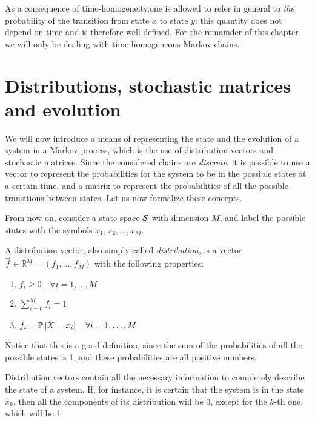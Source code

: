 As a consequence of time-homogeneity,one is allowed to refer in general to \emph{the} probability of the transition from state $x$ to state $y$: this quantity does not depend on time and is therefore well defined. For the remainder of this chapter we will only be dealing with time-homogeneous Markov chains.

\section{Distributions, stochastic matrices and evolution}
We will now introduce a means of representing the state and the evolution of a system in a Markov process, which is the use of distribution vectors and stochastic matrices. Since the considered chains are \emph{discrete}, it is possible to use a vector to represent the probabilities for the system to be in the possible states at a certain time, and a matrix to represent the probabilities of all the possible transitions between states. Let us now formalize these concepts.

\smallskip
From now on, consider a state space $\mathcal{S}$ with dimension $M$, and label the possible states with the symbols $x_1, x_2, \dots, x_M$.

\begin{ndef} \label{def:distribution}
    A distribution vector, also simply called \emph{distribution}, is a vector $\vec{f} \in \mathbb{R}^M = (f_1, \dots, f_M)$ with the following properties:
    \begin{center}
        \begin{enumerate}
            \item $ f_i \geq 0 \quad \forall i = 1,\dots, M $
            \item $\sum_{i=0}^M f_i = 1$
            \item $f_i = \mathbb{P}\left[X = x_i\right] \quad \forall i = 1,\dots, M$
        \end{enumerate}
    \end{center}
    Notice that this is a good definition, since the sum of the probabilities of all the possible states is 1, and these probabilities are all positive numbers.
\end{ndef}

Distribution vectors contain all the necessary information to completely describe the state of a system. If, for instance, it is certain that the system is in the state $x_k$, then all the components of its distribution will be 0, except for the $k$-th one, which will be 1.

